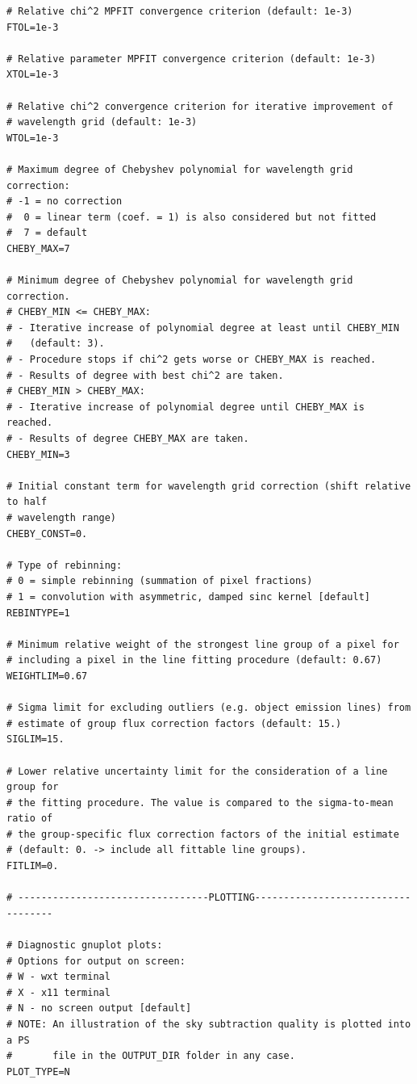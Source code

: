 {\begin{verbatim}
# Relative chi^2 MPFIT convergence criterion (default: 1e-3)
FTOL=1e-3

# Relative parameter MPFIT convergence criterion (default: 1e-3)
XTOL=1e-3

# Relative chi^2 convergence criterion for iterative improvement of
# wavelength grid (default: 1e-3)
WTOL=1e-3

# Maximum degree of Chebyshev polynomial for wavelength grid correction:
# -1 = no correction
#  0 = linear term (coef. = 1) is also considered but not fitted
#  7 = default
CHEBY_MAX=7

# Minimum degree of Chebyshev polynomial for wavelength grid correction.
# CHEBY_MIN <= CHEBY_MAX:
# - Iterative increase of polynomial degree at least until CHEBY_MIN
#   (default: 3).
# - Procedure stops if chi^2 gets worse or CHEBY_MAX is reached.
# - Results of degree with best chi^2 are taken.
# CHEBY_MIN > CHEBY_MAX:
# - Iterative increase of polynomial degree until CHEBY_MAX is reached.
# - Results of degree CHEBY_MAX are taken.
CHEBY_MIN=3

# Initial constant term for wavelength grid correction (shift relative to half
# wavelength range)
CHEBY_CONST=0.

# Type of rebinning:
# 0 = simple rebinning (summation of pixel fractions)
# 1 = convolution with asymmetric, damped sinc kernel [default]
REBINTYPE=1

# Minimum relative weight of the strongest line group of a pixel for
# including a pixel in the line fitting procedure (default: 0.67)
WEIGHTLIM=0.67

# Sigma limit for excluding outliers (e.g. object emission lines) from
# estimate of group flux correction factors (default: 15.)
SIGLIM=15.

# Lower relative uncertainty limit for the consideration of a line group for
# the fitting procedure. The value is compared to the sigma-to-mean ratio of
# the group-specific flux correction factors of the initial estimate
# (default: 0. -> include all fittable line groups).
FITLIM=0.

# ---------------------------------PLOTTING-----------------------------------

# Diagnostic gnuplot plots:
# Options for output on screen:
# W - wxt terminal
# X - x11 terminal
# N - no screen output [default]
# NOTE: An illustration of the sky subtraction quality is plotted into a PS
#       file in the OUTPUT_DIR folder in any case.
PLOT_TYPE=N
\end{verbatim}
}

